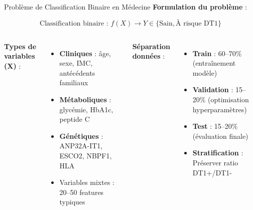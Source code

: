 \documentclass[11pt, aspectratio=169]{beamer}
\begin{document}
\begin{frame}{Problème de Classification Binaire en Médecine}
  \textbf{Formulation du problème} :
  
  \vspace{0.6em}
  
  \begin{equation*}
    \text{Classification binaire : } f(X) \rightarrow Y \in \{\text{Sain}, \text{À risque DT1}\}
  \end{equation*}
  
  \vspace{0.6em}
  
  \begin{columns}[T]
    \textbf{\color{accent2} Types de variables (X)} :
    \begin{itemize}
      \item \textbf{Cliniques} : âge, sexe, IMC, antécédents familiaux
      \item \textbf{Métaboliques} : glycémie, HbA1c, peptide C
      \item \textbf{Génétiques} : ANP32A-IT1, ESCO2, NBPF1, HLA
      \item Variables mixtes : 20--50 features typiques
    \end{itemize}
    
    \textbf{\color{accent2} Séparation données} :
    \begin{itemize}
      \item \textbf{Train} : 60--70\% (entraînement modèle)
      \item \textbf{Validation} : 15--20\% (optimisation hyperparamètres)
      \item \textbf{Test} : 15--20\% (évaluation finale)
      \item \textbf{Stratification} : Préserver ratio DT1+/DT1-
    \end{itemize}
  \end{columns}
\end{frame}
\end{document}

